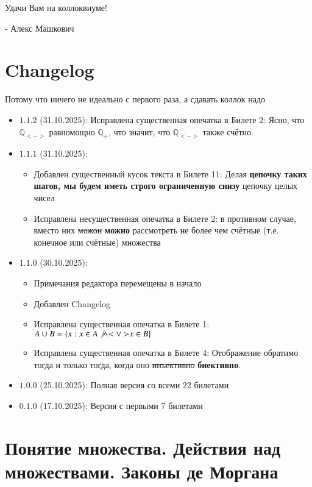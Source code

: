 \documentclass{article}
\begin{document}
Удачи Вам на коллоквиуме!

\hspace*{\fill} - Алекс Машкович


\newpage
\section*{Changelog}
Потому что ничего не идеально с первого раза, а сдавать коллок надо
\begin{itemize}
\item $\mathbf{1.1.2}$ (31.10.2025): Исправлена существенная опечатка в Билете 2: Ясно, что $\mathbb{Q}_\mathbf{<->}$ равномощно $\mathbb{Q}_+$, что значит, что $\mathbb{Q}_\mathbf{<->}$ также счётно.
\item $\mathbf{1.1.1}$ (31.10.2025): \begin{itemize}
\item Добавлен существенный кусок текста в Билете 11: Делая \textbf{цепочку таких шагов, мы будем иметь строго ограниченную снизу} цепочку целых чисел
\item Исправлена несущественная опечатка в Билете 2: в противном случае, вместо них \sout{можон} \textbf{можно} рассмотреть не более чем счётные (т.е. конечное или счётные) множества
\end{itemize}
\item $\mathbf{1.1.0}$ (30.10.2025): \begin{itemize}
\item Примечания редактора перемещены в начало
\item Добавлен Changelog
\item Исправлена существенная опечатка в Билете 1: $A \cup B = \{x : x \in A \not\wedge \mathbf{<\vee>} x \in B \}$
\item Исправлена существенная опечатка в Билете 4: Отображение обратимо тогда и только тогда, когда оно \sout{инъективно} \textbf{биективно}.
\end{itemize}
\item $\mathbf{1.0.0}$ (25.10.2025): Полная версия со всеми 22 билетами
\item $\mathbf{0.1.0}$ (17.10.2025): Версия с первыми 7 билетами
\end{itemize}

\newpage
\section{Понятие множества. Действия над множествами. Законы де Моргана}
\end{document}
